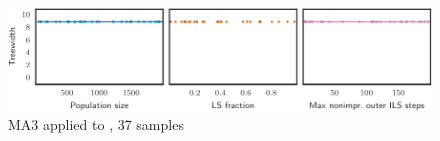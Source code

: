 \begin{figure}[h]\strictpagecheck\centering

\includegraphics[scale=0.85]{plots/MA3-correlation-regplots-jean-0-crop.pdf}


\caption[Parameter influence for MA3 when applied to ]{\gls{MA3} applied to , 37 samples}

\label{MA3-correlation-regplots-jean}

\end{figure}